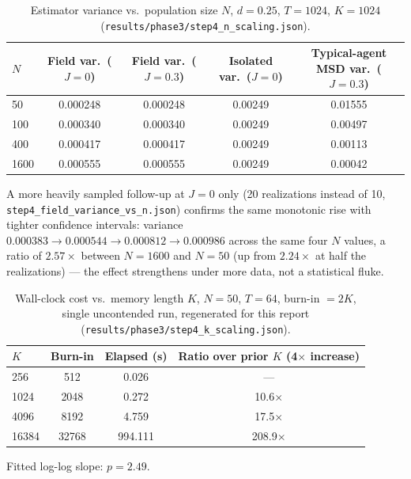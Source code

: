 \documentclass[11pt]{article}
\newcommand{\code}[1]{\texttt{#1}}
\begin{document}
\begin{table}[htbp]
\centering
\caption{Estimator variance vs.\ population size $N$, $d{=}0.25$, $T{=}1024$,
$K{=}1024$ (\code{results/phase3/step4\_n\_scaling.json}).}
\label{tab:n-scaling}
\small
\begin{tabular}{lcccc}
\toprule
$N$ & Field var.\ ($J{=}0$) & Field var.\ ($J{=}0.3$) & Isolated var.\ ($J{=}0$) & Typical-agent MSD var.\ ($J{=}0.3$) \\
\midrule
50 & 0.000248 & 0.000248 & 0.00249 & 0.01555 \\
100 & 0.000340 & 0.000340 & 0.00249 & 0.00497 \\
400 & 0.000417 & 0.000417 & 0.00249 & 0.00113 \\
1600 & 0.000555 & 0.000555 & 0.00249 & 0.00042 \\
\bottomrule
\end{tabular}
\end{table}

A more heavily sampled follow-up at $J{=}0$ only (20 realizations instead of
10, \texttt{step4\_}\allowbreak\texttt{field\_}\allowbreak\texttt{variance\_}\allowbreak\texttt{vs\_n.json}) confirms the
same monotonic rise with tighter confidence intervals: variance
$0.000383\to0.000544\to0.000812\to0.000986$ across the same four $N$ values,
a ratio of $2.57\times$ between $N{=}1600$ and $N{=}50$ (up from $2.24\times$
at half the realizations) --- the effect strengthens under more data, not a
statistical fluke.

\begin{table}[htbp]
\centering
\caption{Wall-clock cost vs.\ memory length $K$, $N{=}50$, $T{=}64$,
burn-in $=2K$, single uncontended run, regenerated for this report
(\code{results/phase3/step4\_k\_scaling.json}).}
\label{tab:k-scaling}
\begin{tabular}{lccc}
\toprule
$K$ & Burn-in & Elapsed (s) & Ratio over prior $K$ (4$\times$ increase) \\
\midrule
256 & 512 & 0.026 & --- \\
1024 & 2048 & 0.272 & 10.6$\times$ \\
4096 & 8192 & 4.759 & 17.5$\times$ \\
16384 & 32768 & 994.111 & 208.9$\times$ \\
\bottomrule
\end{tabular}

\medskip
Fitted log-log slope: $p = 2.49$.
\end{table}
\end{document}
